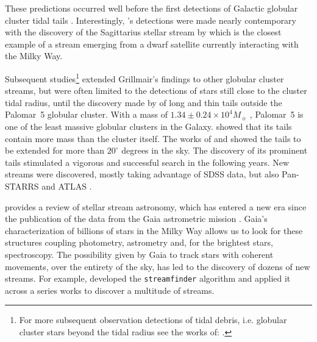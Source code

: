 \documentclass{aa}
\begin{document}
  These predictions occurred well before the first detections of Galactic globular cluster tidal tails \citep{1995AJ....109.2553G}. Interestingly, \citet{1995AJ....109.2553G}'s detections were made nearly contemporary  with the discovery of the Sagittarius stellar stream by \citet{1994Natur.370..194I} which is the closest example of a stream emerging from a dwarf satellite currently interacting with the Milky Way. 
  
  Subsequent studies\footnote{For more subsequent observation detections of tidal debris, i.e. globular cluster stars beyond the tidal radius see the works of: \citet{1997A&A...320..776L, 2000A&A...356..127T, 2000A&A...359..907L, 2001AAS...19910906S, 2003AJ....126..815L,2011ApJ...726...47S,2018MNRAS.476.4814S,2020MNRAS.495.2222S}.} extended Grillmair's findings to other globular cluster streams, but were often limited to the detections of stars still close to the cluster tidal radius, until the discovery made by \citet{2001ApJ...548L.165O,2002AAS...200.1001O, 2003AJ....126.2385O} of long and thin tails outside the Palomar~5 globular cluster. With a mass of $1.34\pm 0.24 \times 10^4 M_{\sun}$ \citep{2019MNRAS.482.5138B}, Palomar~5 is one of the least massive globular clusters in the Galaxy. \citet{2003AJ....126.2385O} showed that its tails contain more mass than the cluster itself. The works of \citet{2006ApJ...641L..37G} and \citet{2015MNRAS.446.3297K} showed the tails to be extended for more than $20^\circ$ degrees in the sky. The discovery of its prominent tails stimulated a vigorous and successful search in the following years. New streams were discovered, mostly taking advantage of SDSS data, but also Pan-STARRS and ATLAS  \citep{2006ApJ...643L..17G, 2006ApJ...637L..29B, 2009ApJ...693.1118G, 2012ApJ...760L...6B, 2013ApJ...769L..23G, 2014ApJ...790L..10G, 2015ApJ...812L..26G, 2014MNRAS.443L..84B, 2016MNRAS.463.1759B, 2017ApJ...847..119G, 2014MNRAS.442L..85K}. 
  
  
  \citet{2025NewAR.10001713B} provides a review of stellar stream astronomy, which has entered a new era since the publication of the data from the Gaia astrometric mission \citep{2016A&A...595A...1G}. Gaia's characterization of billions of stars in the Milky Way allows us to look for these structures coupling photometry, astrometry and, for the brightest stars, spectroscopy. The possibility given by Gaia to track stars with coherent movements, over the entirety of the sky, has led to the discovery of dozens of new streams. For example, \citet{2018MNRAS.477.4063M} developed the \texttt{streamfinder} algorithm and applied it across a series works \citep{2018MNRAS.481.3442M,  2018ApJ...865...85I, 2019ApJ...872..152I} to discover a multitude of streams.%
  
\end{document}
